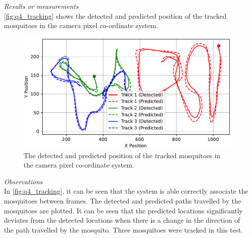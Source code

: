 \textit{Results or measurements}\\
\autoref{fig:q4_tracking} shows the detected and predicted position of the tracked mosquitoes in the camera pixel co-ordinate system.
\begin{figure}[!htb]
  \centering
  \includegraphics[width=\textwidth]{figures/results/tracking.pdf}
  \caption{The detected and predicted position of the tracked mosquitoes in the camera pixel co-ordinate system.}
  \label{fig:q4_tracking}
\end{figure}

\textit{Observations}\\
In \autoref{fig:q4_tracking}, it can be seen that the system is able correctly associate the mosquitoes between frames. The detected and predicted paths travelled by the mosquitoes are plotted. It can be seen that the predicted locations significantly deviates from the detected locations when there is a change in the direction of the path travelled by the mosquito. Three mosquitoes were tracked in this test.

\newpage



